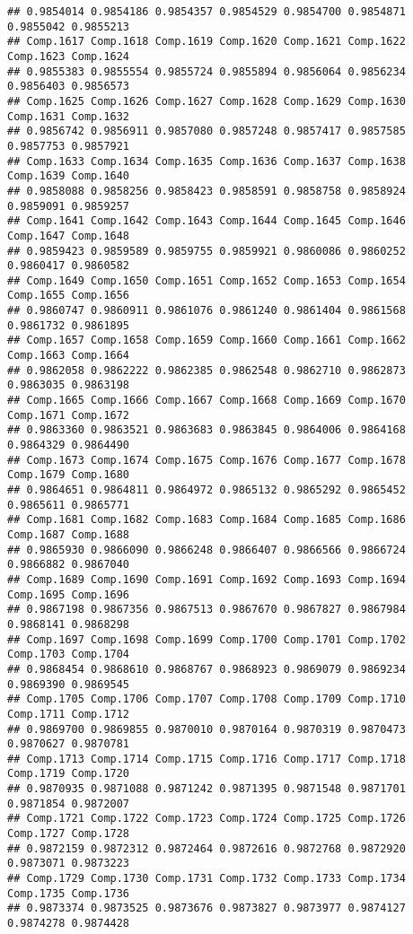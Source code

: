 \documentclass[
]{article}
\begin{document}
\begin{verbatim}
## 0.9854014 0.9854186 0.9854357 0.9854529 0.9854700 0.9854871 0.9855042 0.9855213 
## Comp.1617 Comp.1618 Comp.1619 Comp.1620 Comp.1621 Comp.1622 Comp.1623 Comp.1624 
## 0.9855383 0.9855554 0.9855724 0.9855894 0.9856064 0.9856234 0.9856403 0.9856573 
## Comp.1625 Comp.1626 Comp.1627 Comp.1628 Comp.1629 Comp.1630 Comp.1631 Comp.1632 
## 0.9856742 0.9856911 0.9857080 0.9857248 0.9857417 0.9857585 0.9857753 0.9857921 
## Comp.1633 Comp.1634 Comp.1635 Comp.1636 Comp.1637 Comp.1638 Comp.1639 Comp.1640 
## 0.9858088 0.9858256 0.9858423 0.9858591 0.9858758 0.9858924 0.9859091 0.9859257 
## Comp.1641 Comp.1642 Comp.1643 Comp.1644 Comp.1645 Comp.1646 Comp.1647 Comp.1648 
## 0.9859423 0.9859589 0.9859755 0.9859921 0.9860086 0.9860252 0.9860417 0.9860582 
## Comp.1649 Comp.1650 Comp.1651 Comp.1652 Comp.1653 Comp.1654 Comp.1655 Comp.1656 
## 0.9860747 0.9860911 0.9861076 0.9861240 0.9861404 0.9861568 0.9861732 0.9861895 
## Comp.1657 Comp.1658 Comp.1659 Comp.1660 Comp.1661 Comp.1662 Comp.1663 Comp.1664 
## 0.9862058 0.9862222 0.9862385 0.9862548 0.9862710 0.9862873 0.9863035 0.9863198 
## Comp.1665 Comp.1666 Comp.1667 Comp.1668 Comp.1669 Comp.1670 Comp.1671 Comp.1672 
## 0.9863360 0.9863521 0.9863683 0.9863845 0.9864006 0.9864168 0.9864329 0.9864490 
## Comp.1673 Comp.1674 Comp.1675 Comp.1676 Comp.1677 Comp.1678 Comp.1679 Comp.1680 
## 0.9864651 0.9864811 0.9864972 0.9865132 0.9865292 0.9865452 0.9865611 0.9865771 
## Comp.1681 Comp.1682 Comp.1683 Comp.1684 Comp.1685 Comp.1686 Comp.1687 Comp.1688 
## 0.9865930 0.9866090 0.9866248 0.9866407 0.9866566 0.9866724 0.9866882 0.9867040 
## Comp.1689 Comp.1690 Comp.1691 Comp.1692 Comp.1693 Comp.1694 Comp.1695 Comp.1696 
## 0.9867198 0.9867356 0.9867513 0.9867670 0.9867827 0.9867984 0.9868141 0.9868298 
## Comp.1697 Comp.1698 Comp.1699 Comp.1700 Comp.1701 Comp.1702 Comp.1703 Comp.1704 
## 0.9868454 0.9868610 0.9868767 0.9868923 0.9869079 0.9869234 0.9869390 0.9869545 
## Comp.1705 Comp.1706 Comp.1707 Comp.1708 Comp.1709 Comp.1710 Comp.1711 Comp.1712 
## 0.9869700 0.9869855 0.9870010 0.9870164 0.9870319 0.9870473 0.9870627 0.9870781 
## Comp.1713 Comp.1714 Comp.1715 Comp.1716 Comp.1717 Comp.1718 Comp.1719 Comp.1720 
## 0.9870935 0.9871088 0.9871242 0.9871395 0.9871548 0.9871701 0.9871854 0.9872007 
## Comp.1721 Comp.1722 Comp.1723 Comp.1724 Comp.1725 Comp.1726 Comp.1727 Comp.1728 
## 0.9872159 0.9872312 0.9872464 0.9872616 0.9872768 0.9872920 0.9873071 0.9873223 
## Comp.1729 Comp.1730 Comp.1731 Comp.1732 Comp.1733 Comp.1734 Comp.1735 Comp.1736 
## 0.9873374 0.9873525 0.9873676 0.9873827 0.9873977 0.9874127 0.9874278 0.9874428 

\end{verbatim}
\end{document}
